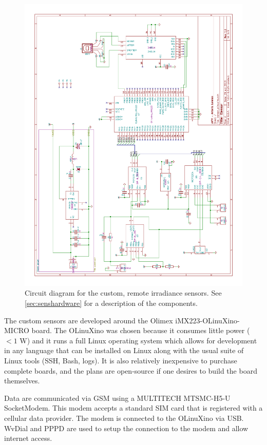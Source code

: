 \begin{figure}
\includegraphics[angle=-90,width=\textwidth]{figs/circuit.pdf}
\caption[Custom sensor circuit diagram]{Circuit diagram for the
  custom, remote irradiance sensors. See \cref{sec:senshardware} for a
  description of the components.}
\label{fig:circuit}
\end{figure}

The custom sensors are developed around the Olimex
iMX223-OLinuXino-MICRO board.
The OLinuXino was chosen because it consumes little power ($< 1$ W) and it
runs a full Linux operating system which allows for development in any
language that can be installed on Linux along with the usual suite of
Linux tools (SSH, Bash, logs).
It is also relatively inexpensive to purchase complete boards, and the
plans are open-source if one desires to build the board themselves.

Data are communicated via GSM using a MULTITECH MTSMC-H5-U SocketModem.
This modem accepts a standard SIM card that is registered with a
cellular data provider.
The modem is connected to the OLinuXino via USB.
WvDial and PPPD are used to setup the connection to the modem and
allow internet access.

